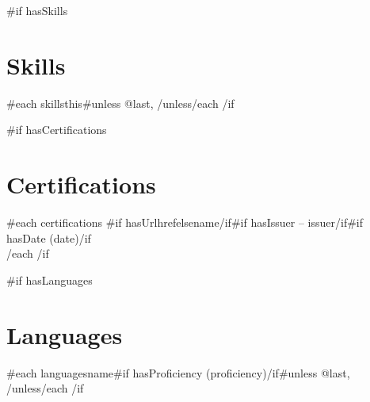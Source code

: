 \documentclass[10.5pt,a4paper]{article}
\begin{document}
{{#if hasSkills}}
\section*{Skills}
{{#each skills}}{{this}}{{#unless @last}}, {{/unless}}{{/each}}
{{/if}}

{{#if hasCertifications}}
\section*{Certifications}
{{#each certifications}}
{{#if hasUrl}}{{href}}{{else}}{{name}}{{/if}}{{#if hasIssuer}} -- {{issuer}}{{/if}}{{#if hasDate}} ({{date}}){{/if}}\\
{{/each}}
{{/if}}

{{#if hasLanguages}}
\section*{Languages}
{{#each languages}}{{name}}{{#if hasProficiency}} ({{proficiency}}){{/if}}{{#unless @last}}, {{/unless}}{{/each}}
{{/if}}
\end{document}
